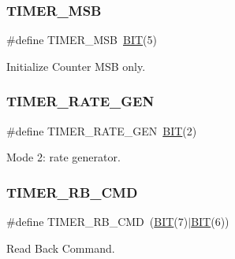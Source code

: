 \hypertarget{group__i8254_ga2a8a6d363c612d756cd8d78480f7cd04}{}\label{group__i8254_ga2a8a6d363c612d756cd8d78480f7cd04} 
\subsubsection{\texorpdfstring{T\+I\+M\+E\+R\+\_\+\+M\+SB}{TIMER\_MSB}}
{\footnotesize\ttfamily \#define T\+I\+M\+E\+R\+\_\+\+M\+SB~\hyperlink{group___serial_ga3a8ea58898cb58fc96013383d39f482c}{B\+IT}(5)}



Initialize Counter M\+SB only. 

\hypertarget{group__i8254_ga5d4449e0fa1cf4a4d107a48a04a1265f}{}\label{group__i8254_ga5d4449e0fa1cf4a4d107a48a04a1265f} 
\subsubsection{\texorpdfstring{T\+I\+M\+E\+R\+\_\+\+R\+A\+T\+E\+\_\+\+G\+EN}{TIMER\_RATE\_GEN}}
{\footnotesize\ttfamily \#define T\+I\+M\+E\+R\+\_\+\+R\+A\+T\+E\+\_\+\+G\+EN~\hyperlink{group___serial_ga3a8ea58898cb58fc96013383d39f482c}{B\+IT}(2)}



Mode 2\+: rate generator. 

\hypertarget{group__i8254_ga4c2eecbfb96744a9c2af71dba75ecb18}{}\label{group__i8254_ga4c2eecbfb96744a9c2af71dba75ecb18} 
\subsubsection{\texorpdfstring{T\+I\+M\+E\+R\+\_\+\+R\+B\+\_\+\+C\+MD}{TIMER\_RB\_CMD}}
{\footnotesize\ttfamily \#define T\+I\+M\+E\+R\+\_\+\+R\+B\+\_\+\+C\+MD~(\hyperlink{group___serial_ga3a8ea58898cb58fc96013383d39f482c}{B\+IT}(7)$\vert$\hyperlink{group___serial_ga3a8ea58898cb58fc96013383d39f482c}{B\+IT}(6))}



Read Back Command. 


